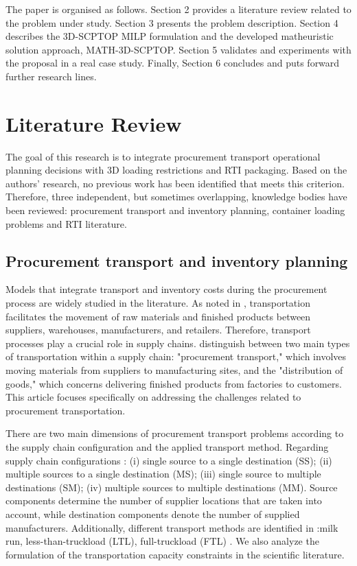 The paper is organised as follows. Section 2 provides a literature review related to the problem under study. Section 3 presents the problem description. Section 4 describes the 3D-SCPTOP MILP formulation and the developed matheuristic solution approach, MATH-3D-SCPTOP. Section 5 validates and experiments with the proposal in a real case study. Finally, Section 6 concludes and puts forward further research lines.

\section{Literature Review}

The goal of this research is to integrate procurement transport operational planning decisions with 3D loading restrictions and RTI packaging. Based on the authors’ research, no previous work has been identified that meets this criterion. Therefore, three independent, but sometimes overlapping, knowledge bodies have been reviewed: procurement transport and inventory planning, container loading problems and RTI literature.

\subsection{Procurement transport and inventory planning}

Models that integrate transport and inventory costs during the procurement process are widely studied in the literature. As noted in \autocite{Langley2020SupplyPerspective}, transportation facilitates the movement of raw materials and finished products between suppliers,  warehouses, manufacturers, and retailers. Therefore, transport processes play a crucial role in supply chains. \autocite{Fleischmann2015TransportDistribution} distinguish between two main types of transportation within a supply chain: "procurement transport," which involves moving materials from suppliers to manufacturing sites, and the "distribution of goods," which concerns delivering finished products from factories to customers. This article focuses specifically on addressing the challenges related to procurement transportation.

There are two main dimensions of procurement transport problems according to the supply chain configuration and the applied transport method. Regarding supply chain configurations \autocite{Mosca2019IntegratedReview}: (i) single source to a single destination (SS); (ii) multiple sources to a single destination (MS);
(iii) single source to multiple destinations (SM); (iv) multiple sources to multiple destinations (MM). Source components determine the number of supplier locations that are taken into account, while destination components denote the number of supplied manufacturers. Additionally, different transport methods are identified in \autocite{Diaz-Madronero2014AChain}:milk run, less-than-truckload (LTL),  full-truckload (FTL) . We also analyze the formulation of the transportation capacity constraints in the scientific literature.

